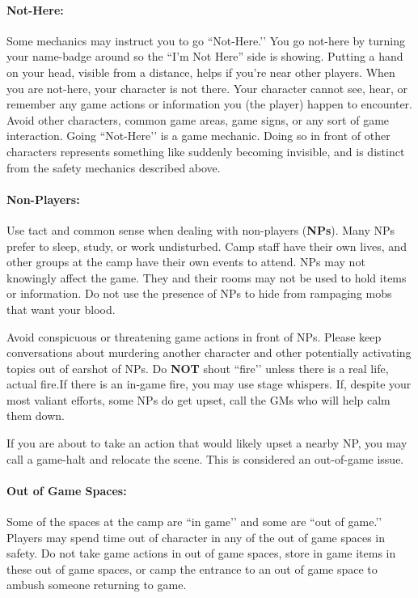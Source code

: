 \documentclass[sheet]{GL2020}
\begin{document}
\paragraph{Not-Here:} Some mechanics may instruct you to go ``Not-Here.’’ You go not-here by turning your name-badge around so the ``I'm Not Here'' side is showing. Putting a hand on your head, visible from a distance, helps if you're near other players. When you are not-here, your character is not there.  Your character cannot see, hear, or remember any game actions or information you (the player) happen to encounter.  Avoid other characters, common game
areas, game signs, or any sort of game interaction. Going ``Not-Here’’ is a game mechanic. Doing so in front of other characters represents something like suddenly becoming invisible, and is distinct from the safety mechanics described above.

\paragraph{Non-Players:} Use tact and common sense when dealing with non-players ({\bf NPs}).  Many NPs prefer to sleep, study, or work undisturbed. Camp staff have their own lives, and other groups at the camp have their own events to attend. NPs may not knowingly affect the game. They and their rooms may not be used to hold items or information. Do not use the presence of NPs to hide from rampaging mobs that want your blood.

Avoid conspicuous or threatening game actions in front of NPs. Please keep conversations about murdering another character and other potentially activating topics out of earshot of NPs. Do \textbf{NOT} shout ``fire’’ unless there is a real life, actual fire.If there is an in-game fire, you may use stage whispers. If, despite your most valiant efforts, some NPs do get upset, call the GMs who will help calm them down.

If you are about to take an action that would likely upset a nearby NP, you may call a game-halt and relocate the scene. This is considered an out-of-game issue.

\paragraph{Out of Game Spaces:} Some of the spaces at the camp are ``in game’’ and some are ``out of game.’’ Players may spend time out of character in any of the out of game spaces in safety. Do not take game actions in out of game spaces, store in game items in these out of game spaces, or camp the entrance to an out of game space to ambush someone returning to game.
\end{document}
